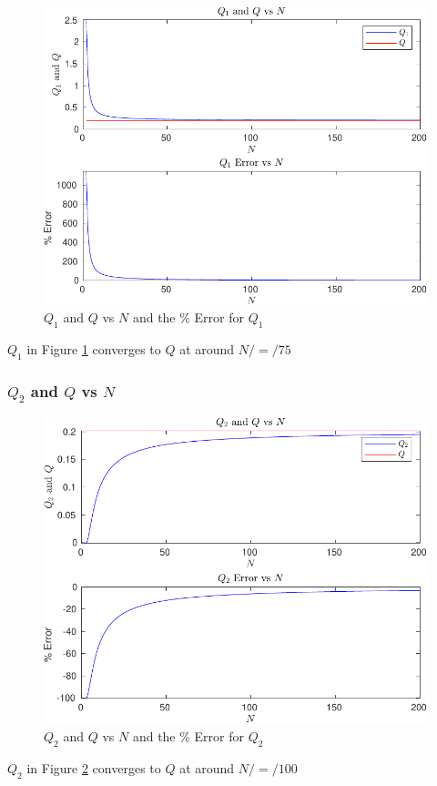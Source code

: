 \documentclass[12pt, a4paper]{article}
\begin{document}
				\begin{figure}[H]
					\centering
					\includegraphics[width=1\linewidth]{Code/Fig/q1_sum_error_plot.pdf}
					\caption{\Large $Q_{1}$ and $Q$ vs $N$ and the \% Error for $Q_{1}$}
					\label{fig:q1sumerrorplot}
				\end{figure}	
				 $Q_{1}$ in Figure \ref{fig:q1sumerrorplot} converges to $Q$ at around $N / = / 75$	
			\subsubsection{$Q_{2}$ and $Q$ vs $N$}
				
				
				
				\begin{figure}[H]
					\centering
					\includegraphics[width=1\linewidth]{Code/Fig/q2_sum_error_plot.pdf}
					\caption{\Large $Q_{2}$ and $Q$ vs $N$ and the \% Error for $Q_{2}$}
					\label{fig:q2sumerrorplot}
				\end{figure}
				 $Q_{2}$ in Figure \ref{fig:q2sumerrorplot} converges to $Q$ at around $N / = / 100$		
\end{document}
